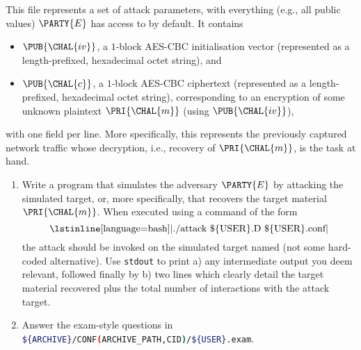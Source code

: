 \documentclass[crop={false},multi={true},tikz={true}]{standalone}
\begin{document}

This file represents a set of attack parameters, with everything (e.g.,
all public values) $\PARTY{E}$ has access to by default.  It contains 

\begin{itemize}
\item $\PUB{\CHAL{iv}}$,
      a  ${1}$-block AES-CBC initialisation vector
      (represented as a  length-prefixed, hexadecimal octet   string),
      and
\item $\PUB{\CHAL{c}}$,
      a  ${1}$-block AES-CBC ciphertext 
      (represented as a  length-prefixed, hexadecimal octet   string),
      corresponding to an encryption of some unknown plaintext 
      $\PRI{\CHAL{m}}$ (using $\PUB{\CHAL{iv}}$),
\end{itemize}

\noindent
with one field per line.
More specifically, this represents the previously captured network traffic
whose decryption, i.e., recovery of $\PRI{\CHAL{m}}$, is the task at hand.
%


\begin{enumerate}
\item Write a program that simulates the adversary $\PARTY{E}$ by attacking
      the simulated target, or, more specifically, that recovers the target 
      material $\PRI{\CHAL{m}}$.  
      When executed using a command of the form
      \[
      \mbox{\lstinline[language={bash}]|./attack \$\{USER\}.D \$\{USER\}.conf|}
      \]
      the attack should be invoked on the simulated target named (not some
      hard-coded alternative).  Use \lstinline[language={bash}]{stdout} to 
      print 
      a) any intermediate output you deem relevant, followed finally by 
      b) two lines which clearly detail the target material recovered plus
         the total number of interactions with the attack target.
\item Answer the exam-style questions in 
      \lstinline[language={bash}]|${ARCHIVE}/CONF(ARCHIVE_PATH,CID)/${USER}.exam|.
\end{enumerate}
\end{document}
